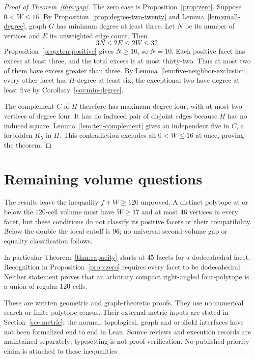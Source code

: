 \documentclass[11pt]{article}
\theoremstyle{remark}
\begin{document}
\begin{proof}[Proof of Theorem~\ref{thm:gap}]
The zero case is Proposition~\ref{prop:zero}. Suppose $0<W\le16$.
By Proposition~\ref{prop:degree-two-twenty} and
Lemma~\ref{lem:small-degree}, graph $G$ has minimum degree at
least three. Let $N$ be its number of vertices and $E$ its
unweighted edge count. Then
\[
 3N\le2E\le2W\le32.
\]
Proposition~\ref{prop:ten-positive} gives $N\ge10$, so $N=10$.
Each positive facet has excess at least three, and the total excess
is at most thirty-two. Thus at most two of them have excess greater
than three. By Lemma~\ref{lem:five-neighbor-exclusion}, every
other facet has $H$-degree at least six; the exceptional two have
degree at least five by Corollary~\ref{cor:min-degree}.

The complement $C$ of $H$ therefore has maximum degree four,
with at most two vertices of degree four. It has no induced pair
of disjoint edges because $H$ has no induced square.
Lemma~\ref{lem:ten-complement} gives an independent five in $C$,
a forbidden $K_5$ in $H$. This contradiction excludes all
$0<W\le16$ at once, proving the theorem.
\end{proof}

\section{Remaining volume questions}

The results leave the inequality $f+W\ge120$ unproved. A distinct
polytope at or below the $120$-cell volume must have $W\ge17$ and
at most $46$ vertices in every facet, but these conditions do not
classify its positive facets or their compatibility. Below the double
the local cutoff is $96$;
no universal second-volume gap or equality classification follows.

In particular Theorem~\ref{thm:capacity} starts at $45$ facets for
a dodecahedral facet. Recognition in Proposition~\ref{prop:zero}
requires every facet to be dodecahedral. Neither statement proves
that an arbitrary compact right-angled four-polytope is a union of
regular $120$-cells.

These are written geometric and graph-theoretic proofs. They use no
numerical search or finite polytope census. Their external metric
inputs are stated in Section~\ref{sec:metric}; the normal, topological,
graph and orbifold interfaces have not been formalized end to end in
Lean. Source reviews and execution records are maintained separately;
typesetting is not proof verification. No published priority claim
is attached to these inequalities.
\end{document}
